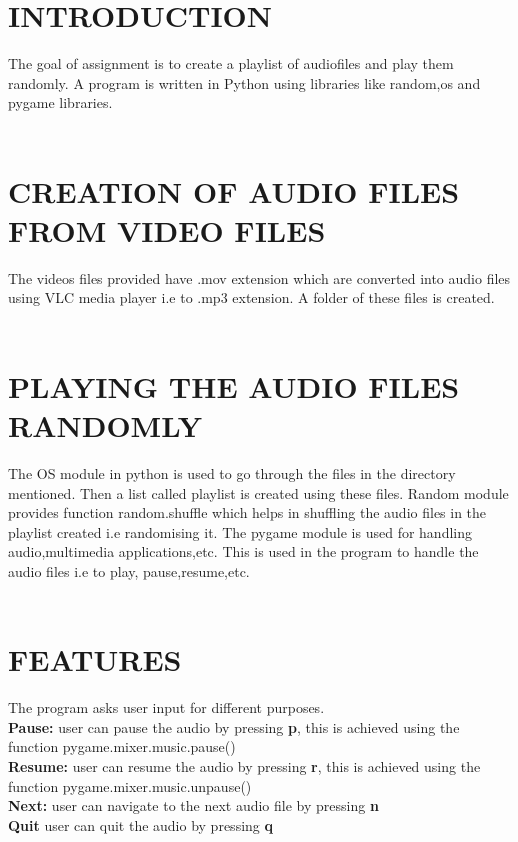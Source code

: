 \documentclass[journal,12pt,twocolumn]{IEEEtran}
\begin{document}
\maketitle
\bigskip
\section{INTRODUCTION} 	The goal of assignment is to create a playlist of audiofiles and play them randomly. A program is written in Python using libraries like random,os and pygame libraries.
\\
\\
\section{CREATION OF AUDIO FILES FROM VIDEO FILES} The videos files provided have .mov extension which are converted into audio files using VLC media player i.e to .mp3 extension. A folder of these files is created.
\\
\\
\section{PLAYING THE AUDIO FILES RANDOMLY} The OS module in python is used to go through the files in the directory mentioned. Then a list called playlist is created using these files. Random module provides function random.shuffle which helps in shuffling the audio files in the playlist created i.e randomising it.
The pygame module is used for handling audio,multimedia applications,etc. This is used in the program to handle the audio files i.e to play, pause,resume,etc.
\\
\\
\section{FEATURES} The program asks user input for different purposes. \\
\textbf{Pause:} user can pause the audio by pressing \textbf{p}, this is achieved using the function pygame.mixer.music.pause()\\
\textbf{Resume:} user can resume the audio by pressing \textbf{r}, this is achieved using the function pygame.mixer.music.unpause()\\
\textbf{Next:} user can navigate to the next audio file by pressing \textbf{n}\\
\textbf{Quit } user can quit the audio by pressing \textbf{q}
\\
\\
\end{document}
